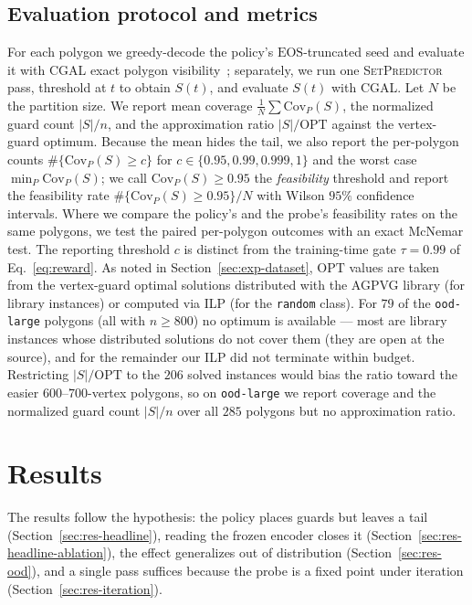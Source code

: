 \documentclass[preprint,10pt]{elsarticle}
\newcommand{\Covf}[1]{\mathrm{Cov}_P(#1)}
\newcommand{\EOS}{\mathrm{EOS}}
\newcommand{\OPT}{\mathrm{OPT}}
\newcommand{\SetPredictor}{\textup{\textsc{SetPredictor}}}
\newcommand{\cfeas}{0.95} %
\begin{document}
\subsection{Evaluation protocol and metrics}
\label{sec:exp-eval}

For each polygon we greedy-decode the policy's $\EOS$-truncated seed and evaluate it with CGAL exact polygon visibility~\cite{cgal:eb-25b}; separately, we run one \SetPredictor{} pass, threshold at $t$ to obtain $S(t)$, and evaluate $S(t)$ with CGAL. Let $N$ be the partition size. We report mean coverage $\frac{1}{N}\sum \Covf{S}$, the normalized guard count $|S|/n$, and the approximation ratio $|S|/\OPT$ against the vertex-guard optimum. Because the mean hides the tail, we also report the per-polygon counts $\#\{\Covf{S} \geq c\}$ for $c \in \{0.95, 0.99, 0.999, 1\}$ and the worst case $\min_P \Covf{S}$; we call $\Covf{S} \geq \cfeas$ the \emph{feasibility} threshold and report the feasibility rate $\#\{\Covf{S} \geq \cfeas\}/N$ with Wilson $95\%$ confidence intervals. Where we compare the policy's and the probe's feasibility rates on the same polygons, we test the paired per-polygon outcomes with an exact McNemar test. The reporting threshold $c$ is distinct from the training-time gate $\tau = 0.99$ of Eq.~\eqref{eq:reward}. As noted in Section~\ref{sec:exp-dataset}, $\OPT$ values are taken from the vertex-guard optimal solutions distributed with the AGPVG library (for library instances) or computed via ILP (for the \texttt{random} class). For $79$ of the \texttt{ood-large} polygons (all with $n \geq 800$) no optimum is available --- most are library instances whose distributed solutions do not cover them (they are open at the source), and for the remainder our ILP did not terminate within budget. Restricting $|S|/\OPT$ to the $206$ solved instances would bias the ratio toward the easier $600$--$700$-vertex polygons, so on \texttt{ood-large} we report coverage and the normalized guard count $|S|/n$ over all $285$ polygons but no approximation ratio.

\section{Results}
\label{sec:results}

The results follow the hypothesis: the policy places guards but leaves a tail (Section~\ref{sec:res-headline}), reading the frozen encoder closes it (Section~\ref{sec:res-headline-ablation}), the effect generalizes out of distribution (Section~\ref{sec:res-ood}), and a single pass suffices because the probe is a fixed point under iteration (Section~\ref{sec:res-iteration}).
\end{document}
